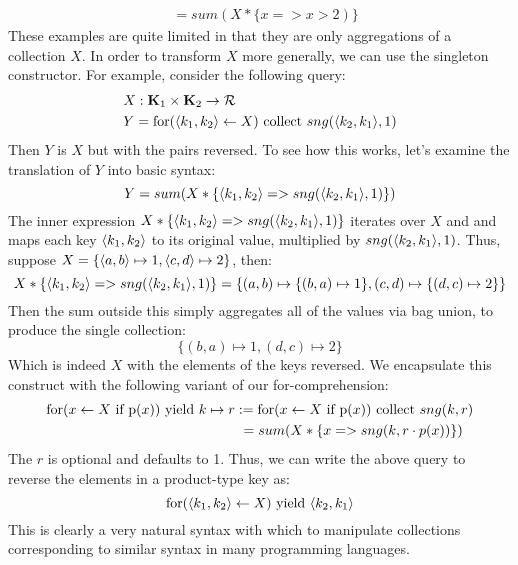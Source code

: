 {{{{\begin{equation*}
\begin{split}
&=sum(X * \{x => x > 2) \}
\end{split}
\end{equation*}
These examples are quite limited in that they are only aggregations of a collection $X$. In order to transform $X$ more generally, we can use the singleton constructor. For example, consider the following query:
\begin{equation*}
\begin{split}
&X: \mathbf{K}_1 \times \mathbf{K}_2 \rightarrow \mathcal{R} \\
&Y = \textrm{for}(\langle k_1, k_2 \rangle \leftarrow X) \textrm{ collect } sng(\langle k_2, k_1 \rangle, 1)
\end{split}
\end{equation*}
Then $Y$ is $X$ but with the pairs reversed. To see how this works, let's examine the translation of $Y$ into basic syntax: 
\[ Y = sum(X*\{\langle k_1, k_2 \rangle => sng(\langle k_2, k_1 \rangle,1)\}) \]
The inner expression $X*\{\langle k_1, k_2 \rangle => sng(\langle k_2, k_1 \rangle,1)\}$ iterates over $X$ and and maps each key $\langle k_1, k_2 \rangle$ to its original value, multiplied by $sng(\langle k_2, k_1 \rangle,1)$. Thus, suppose $X = \{\langle a, b \rangle \mapsto 1, \langle c, d \rangle \mapsto 2\}$, then:
\begin{equation*}
X*\{\langle k_1, k_2 \rangle => sng(\langle k_2, k_1 \rangle,1)\} = \{(a,b) \mapsto \{(b,a) \mapsto 1\}, (c,d) \mapsto \{(d,c) \mapsto 2\}\}
\end{equation*}
Then the sum outside this simply aggregates all of the values via bag union, to produce the single collection:
\begin{equation*}
\{(b,a) \mapsto 1, (d,c) \mapsto 2\}
\end{equation*}
Which is indeed $X$ with the elements of the keys reversed. We encapsulate this construct with the following variant of our for-comprehension: 
\begin{equation*}
\begin{split}
\textrm{for}(x \leftarrow X \textrm{ if p}(x)) \textrm{ yield } k \mapsto r &:= \textrm{for}(x \leftarrow X \textrm{ if p}(x)) \textrm{ collect } sng(k,r) \\
& \ = sum(X * \{x => sng(k,r \cdot p(x)) \})
\end{split}
\end{equation*}
The $r$ is optional and defaults to 1. Thus, we can write the above query to reverse the elements in a product-type key as:
\[\textrm{for}(\langle k_1, k_2 \rangle \leftarrow X) \textrm{ yield } \langle k_2, k_1 \rangle\]
This is clearly a very natural syntax with which to manipulate collections corresponding to similar syntax in many programming languages.
}

}}}
